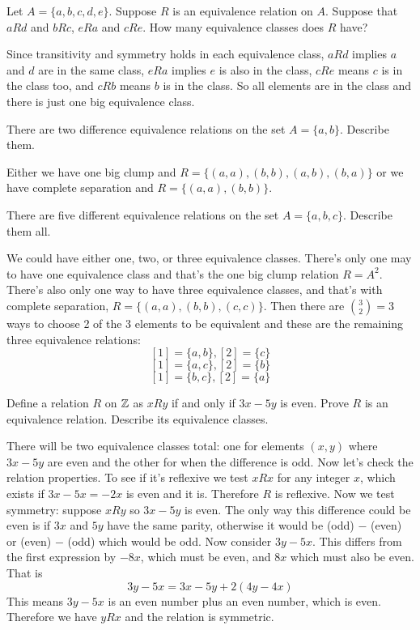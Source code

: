 \documentclass{article}
\begin{document}
\begin{problem}
Let $A= \{a, b, c, d, e\}$. Suppose $R$ is an equivalence relation on $A$. Suppose that $aRd$ and $bRc$, $eRa$ and $cRe$. How many equivalence classes does $R$ have?
\end{problem}

Since transitivity and symmetry holds in each equivalence class, $aRd$ implies $a$ and $d$ are in the same class, $eRa$ implies $e$ is also in the class, $cRe$ means $c$ is in the class too, and $cRb$ means $b$ is in the class. So all elements are in the class and there is just one big equivalence class.

\begin{problem}
There are two difference equivalence relations on the set $A = \{a, b\}$. Describe them.
\end{problem}

Either we have one big clump and $R = \{(a, a), (b, b), (a, b), (b, a)\}$ or we have complete separation and $R = \{(a, a), (b, b)\}$.

\begin{problem}
There are five different equivalence relations on the set $A = \{a, b, c\}$. Describe them all.
\end{problem}

We could have either one, two, or three equivalence classes. There's only one may to have one equivalence class and that's the one big clump relation $R = A^2$. There's also only one way to have three equivalence classes, and that's with complete separation, $R = \{(a, a), (b, b), (c, c)\}$. Then there are $\binom{3}{2} = 3$ ways to choose 2 of the 3 elements to be equivalent and these are the remaining three equivalence relations:
$$[1] = \{a, b\}, [2] = \{c\}$$
$$[1] = \{a, c\}, [2] = \{b\}$$
$$[1] = \{b, c\}, [2] = \{a\}$$

\begin{problem}
Define a relation $R$ on $\mathbb{Z}$ as $xRy$ if and only if $3x - 5y$ is even. Prove $R$ is an equivalence relation. Describe its equivalence classes.
\end{problem}

There will be two equivalence classes total: one for elements $(x, y)$ where $3x - 5y$ are even and the other for when the difference is odd. Now let's check the relation properties. To see if it's reflexive we test $xRx$ for any integer $x$, which exists if $3x - 5x = -2x$ is even and it is. Therefore $R$ is reflexive. Now we test symmetry: suppose $xRy$ so $3x - 5y$ is even. The only way this difference could be even is if $3x$ and $5y$ have the same parity, otherwise it would be (odd) $-$ (even) or (even) $-$ (odd) which would be odd. Now consider $3y - 5x$. This differs from the first expression by $-8x$, which must be even, and $8x$ which must also be even. That is
$$3y - 5x = 3x - 5y + 2(4y - 4x)$$
This means $3y - 5x$ is an even number plus an even number, which is even. Therefore we have $yRx$ and the relation is symmetric.
\end{document}
